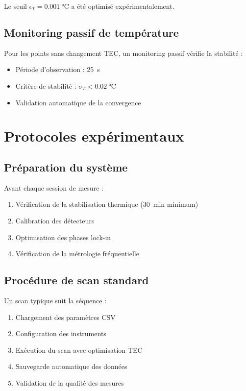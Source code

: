 Le seuil $\epsilon_T = \SI{0.001}{\celsius}$ a été optimisé expérimentalement.

\subsection{Monitoring passif de température}

Pour les points sans changement TEC, un monitoring passif vérifie la stabilité :

\begin{itemize}
    \item Période d'observation : \SI{25}{\second}
    \item Critère de stabilité : $\sigma_T < \SI{0.02}{\celsius}$
    \item Validation automatique de la convergence
\end{itemize}

\section{Protocoles expérimentaux}

\subsection{Préparation du système}

Avant chaque session de mesure :
\begin{enumerate}
    \item Vérification de la stabilisation thermique (\SI{30}{\minute} minimum)
    \item Calibration des détecteurs
    \item Optimisation des phases lock-in
    \item Vérification de la métrologie fréquentielle
\end{enumerate}

\subsection{Procédure de scan standard}

Un scan typique suit la séquence :
\begin{enumerate}
    \item Chargement des paramètres CSV
    \item Configuration des instruments
    \item Exécution du scan avec optimisation TEC
    \item Sauvegarde automatique des données
    \item Validation de la qualité des mesures
\end{enumerate}

